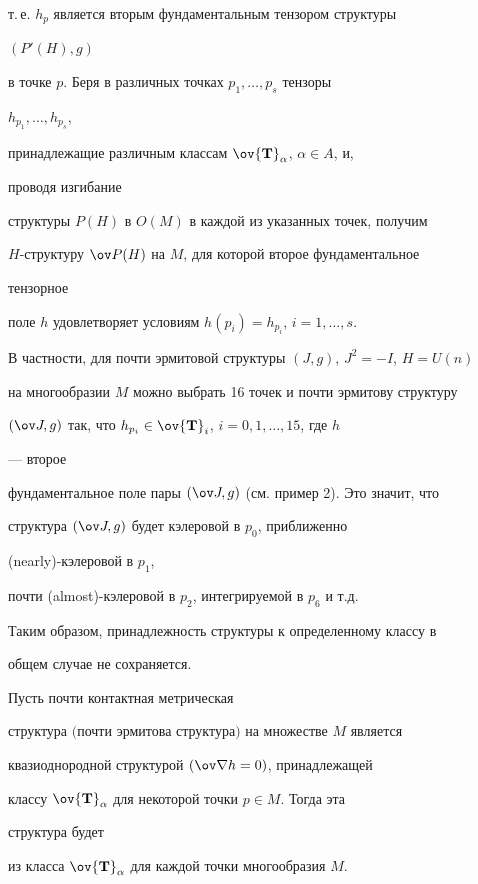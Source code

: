 т.\,е. $h_p$ является вторым фундаментальным тензором структуры 


$(P'(H),g)$ 


в точке $p$. Беря в различных точках $p_1,\dotsc,p_s$ тензоры 


$h_{p_1},\dotsc,h_{p_s}$, 


принадлежащие различным классам $\ov{\bold T}_\alpha$, $\alpha\in A$, и, 


проводя изгибание 


структуры $P(H)$ в $O(M)$ в каждой из указанных точек, получим 


$H$-структуру $\ov P(H)$ на $M$, для которой второе фундаментальное 


тензорное 


поле $h$ удовлетворяет условиям $h(p_i)=h_{p_i}$, $i=1,\dotsc,s$. 


В частности, для почти эрмитовой структуры $(J,g)$, $J^2=-I$, $H=U(n)$ 


на многообразии $M$ можно выбрать 16 точек и почти эрмитову структуру 


$(\ov J,g)$ так, что $h_{p_i}\in\ov{\bold T}_i$, $i=0,1,\dotsc,15$, где $h$ 


--- второе 


фундаментальное поле пары $(\ov J,g)$ (см. пример 2). Это значит, что 


структура $(\ov J,g)$ будет кэлеровой в $p_0$, приближенно


(nearly)-кэлеровой в $p_1$, 


почти (almost)-кэлеровой в $p_2$, интегрируемой в $p_6$ и т.д. 


 


Таким образом, принадлежность структуры к определенному классу в 


общем случае не сохраняется. 


 


\begin{thm} 


Пусть почти контактная метрическая 


структура $($почти эрмитова структура$)$ на множестве $M$ является 


квазиоднородной структурой $(\ov\nabla h=0)$, принадлежащей 


классу $\ov{\bold T}_\alpha$ для некоторой точки $p\in M$. Тогда эта 


структура будет 


из класса $\ov{\bold T}_\alpha$ для каждой точки многообразия $M$. 


\end{thm} 


